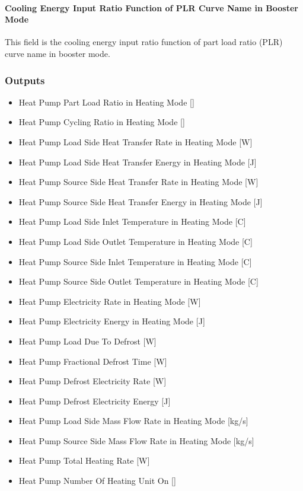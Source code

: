 \paragraph{Cooling Energy Input Ratio Function of PLR Curve Name in Booster
Mode} This field is the cooling energy input ratio function of part load ratio
(PLR) curve name in booster mode.

\subsubsection{Outputs}\label{outputs-heatpump-air-to-water}
\begin{itemize}
\item Heat Pump Part Load Ratio in Heating Mode {[}{]}
\item Heat Pump Cycling Ratio in Heating Mode {[}{]}
\item Heat Pump Load Side Heat Transfer Rate in Heating Mode {[}W{]}
\item Heat Pump Load Side Heat Transfer Energy in Heating Mode {[}J{]}
\item Heat Pump Source Side Heat Transfer Rate in Heating Mode {[}W{]}
\item Heat Pump Source Side Heat Transfer Energy in Heating Mode {[}J{]}
\item Heat Pump Load Side Inlet Temperature in Heating Mode {[}C{]}
\item Heat Pump Load Side Outlet Temperature in Heating Mode {[}C{]}
\item Heat Pump Source Side Inlet Temperature in Heating Mode {[}C{]}
\item Heat Pump Source Side Outlet Temperature in Heating Mode {[}C{]}
\item Heat Pump Electricity Rate in Heating Mode {[}W{]}
\item Heat Pump Electricity Energy in Heating Mode {[}J{]}
\item Heat Pump Load Due To Defrost {[}W{]}
\item Heat Pump Fractional Defrost Time {[}W{]}
\item Heat Pump Defrost Electricity Rate {[}W{]}
\item Heat Pump Defrost Electricity Energy {[}J{]}
\item Heat Pump Load Side Mass Flow Rate in Heating Mode {[}kg/s{]}
\item Heat Pump Source Side Mass Flow Rate in Heating Mode {[}kg/s{]}
\item Heat Pump Total Heating Rate {[}W{]}
\item Heat Pump Number Of Heating Unit On {[}{]}

\end{itemize}
